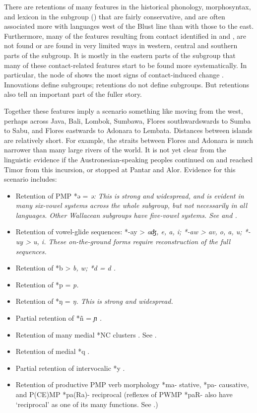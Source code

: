 There are retentions of many features in the historical phonology,
morphosyntax, and lexicon in the  subgroup
() that are fairly conservative,
and are often associated more with languages west of the Blust
line than with those to the east.
Furthermore, many of the features resulting
from contact identified in  and ,
are not found or are found in very limited ways in western,
central and southern parts of the  subgroup.
It is mostly in the eastern parts of the subgroup that many of
these contact-related features start to be found more systematically.
In particular, the  node of 
shows the most signs of contact-induced change \citep{Fricke2019}.
Innovations define subgroups; retentions do not define subgroups.
But retentions also tell an important part of the fuller story.

Together these features imply a scenario something like moving
from the west, perhaps across Java, Bali,
Lombok, Sumbawa, Flores southwardswards to Sumba to Sabu,
and Flores eastwards to Adonara to Lembata.
Distances between islands are relatively short.
For example, the straits between Flores
and Adonara is much narrower than many large rivers of the world.
It is not yet clear from the linguistic evidence if the Austronesian-speaking
peoples continued on and reached Timor from this incursion,
or stopped at Pantar and Alor.
Evidence for this scenario includes:

\begin{itemize}
	\item	Retention of PMP *ə = \it{ə}: This is strong
				and widespread, and is evident in many six-vowel systems across
				the whole subgroup, but not necessarily in all languages.
				Other Wallacean subgroups have five-vowel systems.
				See  and .
	\item	Retention of vowel-glide sequences: *-ay > \it{aʤ,
				e, a, i}; *-aw > \it{av,
				o, a,} \it{u}; *-uy > \it{u, i}.
				These on-the-ground forms require reconstruction of the full sequences.
	\item	Retention of *b > \it{b,
				w}; *d = \it{d} \citep[56, 85f]{Blust2008}.
	\item	Retention of *p = \it{p}.
	\item	Retention of *ŋ = \it{ŋ}.
				This is strong and widespread.
	\item	Partial retention of *ñ = \it{ɲ} \citep[57, 68]{Blust2008}.
	\item	Retention of many medial *NC clusters \citep[54]{Blust2008}. See .
	\item	Retention of medial *q \citep[76f, 85]{Blust2008}.
	\item	Partial retention of intervocalic *y \citep[88]{Blust2008}.
	\item	Retention of productive PMP verb morphology *ma- stative,
				*pa- causative, and P(CE)MP *pa(Ra)- reciprocal (reflexes of
				PWMP *paR- also have ‘reciprocal’ as one of its many functions.
				See .) 
\end{itemize}

